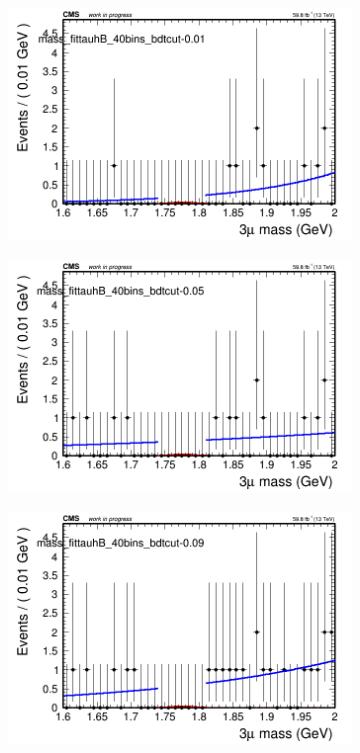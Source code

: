 \begin{figure}[H]
    \centering
    \begin{subfigure}{0.2\textwidth}
        \includegraphics[width=\textwidth]{unfixed_exp/plots/tauhB/massfit_tauhB_40bins_bdtcut-0.01.png}
        \caption{}
    \end{subfigure}
    \begin{subfigure}{0.2\textwidth}
        \includegraphics[width=\textwidth]{unfixed_exp/plots/tauhB/massfit_tauhB_40bins_bdtcut-0.05.png}
        \caption{}
    \end{subfigure}
    \begin{subfigure}{0.2\textwidth}
        \includegraphics[width=\textwidth]{unfixed_exp/plots/tauhB/massfit_tauhB_40bins_bdtcut-0.09.png}

\end{subfigure}
\end{figure}
